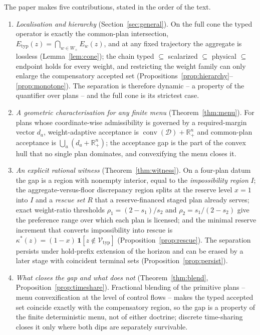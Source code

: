 \documentclass[preprint,11pt,authoryear]{elsarticle}
\theoremstyle{definition}
\theoremstyle{remark}
\newcommand{\Etyp}{E_{\mathrm{typ}}}
\newcommand{\Vtyp}{\mathcal{V}_{\mathrm{typ}}}
\newcommand{\Wp}{W_+}
\newcommand{\conv}{\operatorname{conv}}
\newcommand{\Rp}{\mathbb{R}^n_+}
\begin{document}
The paper makes five contributions, stated in the order of the text.
\begin{enumerate}[leftmargin=2em,label=(\roman*)]
\item \emph{Localisation and hierarchy} (Section~\ref{sec:general}). On the full cone the typed operator is exactly the common-plan intersection, $\Etyp(z)=\bigcap_{w\in\Wp}E_w(z)$, and at any fixed trajectory the aggregate is lossless (Lemma~\ref{lem:cone}); the chain typed $\subseteq$ scalarized $\subseteq$ physical $\subseteq$ endpoint holds for every weight, and restricting the weight family can only enlarge the compensatory accepted set (Propositions~\ref{prop:hierarchy}--\ref{prop:monotone}). The separation is therefore dynamic -- a property of the quantifier over plans -- and the full cone is its strictest case.
\item \emph{A geometric characterisation for any finite menu} (Theorem~\ref{thm:menu}). For plans whose coordinate-wise admissibility is governed by a required-margin vector $d_a$, weight-adaptive acceptance is $\conv(\mathcal D)+\Rp$ and common-plan acceptance is $\bigcup_a(d_a+\Rp)$; the acceptance gap is the part of the convex hull that no single plan dominates, and convexifying the menu closes it.
\item \emph{An explicit rational witness} (Theorem~\ref{thm:witness}). On a four-plan datum the gap is a region with nonempty interior, equal to the \emph{impossibility region} $I$; the aggregate-versus-floor discrepancy region splits at the reserve level $x=1$ into $I$ and a \emph{rescue set} $R$ that a reserve-financed staged plan already serves; exact weight-ratio thresholds $\rho_1=(2-s_1)/s_2$ and $\rho_2=s_1/(2-s_2)$ give the preference range over which each plan is licensed; and the minimal reserve increment that converts impossibility into rescue is $\kappa^*(z)=(1-x)\,\mathbf 1[z\notin\Vtyp]$ (Proposition~\ref{prop:rescue}). The separation persists under hold-prefix extension of the horizon and can be erased by a later stage with coincident terminal sets (Proposition~\ref{prop:persist}).
\item \emph{What closes the gap and what does not} (Theorem~\ref{thm:blend}, Proposition~\ref{prop:timeshare}). Fractional blending of the primitive plans -- menu convexification at the level of control flows -- makes the typed accepted set coincide exactly with the compensatory region, so the gap is a property of the finite deterministic menu, not of either doctrine; discrete time-sharing closes it only where both dips are separately survivable.

\end{enumerate}
\end{document}
